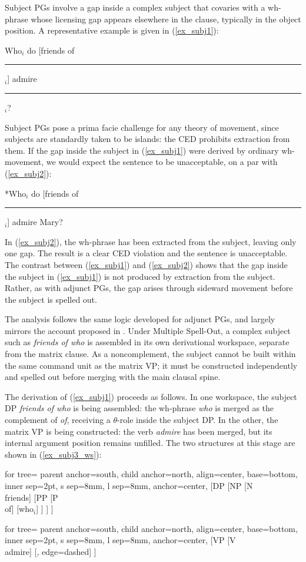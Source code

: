 \documentclass[12pt]{article}
\newcommand{\gap}{\rule{1.25em}{.5pt}} %
\newcommand{\TwoTreeCols}[2]{%
  \noindent\parbox[t]{0.47\linewidth}{#1}%
  \hspace{1.2em}%
  \parbox[t]{0.47\linewidth}{#2}\par
}
\begin{document}
Subject PGs involve a gap inside a complex subject that covaries with a wh-phrase whose licensing gap appears elsewhere in the clause, typically in the object position. A representative example is given in (\ref{ex_subj1}):

\ex \label{ex_subj1}
Who$_i$ do [friends of \gap{}$_i$] admire \gap{}$_i$?
\xe

\noindent
Subject PGs pose a prima facie challenge for any theory of movement, since subjects are standardly taken to be islands: the CED prohibits extraction from them. If the gap inside the subject in (\ref{ex_subj1}) were derived by ordinary wh-movement, we would expect the sentence to be unacceptable, on a par with (\ref{ex_subj2}):

\ex \label{ex_subj2}
*Who$_i$ do [friends of \gap{}$_i$] admire Mary?
\xe

\noindent
In (\ref{ex_subj2}), the wh-phrase has been extracted from the subject, leaving only one gap. The result is a clear CED violation and the sentence is unacceptable. The contrast between (\ref{ex_subj1}) and (\ref{ex_subj2}) shows that the gap inside the subject in (\ref{ex_subj1}) is not produced by extraction from the subject. Rather, as with adjunct PGs, the gap arises through sideward movement before the subject is spelled out.

The analysis follows the same logic developed for adjunct PGs, and largely mirrors the account proposed in \cite{nunes2004}. Under Multiple Spell-Out, a complex subject such as \textit{friends of who} is assembled in its own derivational workspace, separate from the matrix clause. As a noncomplement, the subject cannot be built within the same command unit as the matrix VP; it must be constructed independently and spelled out before merging with the main clausal spine.

The derivation of (\ref{ex_subj1}) proceeds as follows. In one workspace, the subject DP \textit{friends of who} is being assembled: the wh-phrase \textit{who} is merged as the complement of \textit{of}, receiving a $\theta$-role inside the subject DP. In the other, the matrix VP is being constructed: the verb \textit{admire} has been merged, but its internal argument position remains unfilled. The two structures at this stage are shown in (\ref{ex_subj3_ws}):

\ex \label{ex_subj3_ws}
\TwoTreeCols{%
\begin{forest}
for tree={
  parent anchor=south,
  child anchor=north,
  align=center,
  base=bottom,
  inner sep=2pt,
  s sep=8mm,
  l sep=8mm,
  anchor=center,
}
[DP
  [NP
    [N\\friends]
    [PP
      [P\\of]
      [who$_i$]
    ]
  ]
]
\end{forest}%
}{%
\begin{forest}
for tree={
  parent anchor=south,
  child anchor=north,
  align=center,
  base=bottom,
  inner sep=2pt,
  s sep=8mm,
  l sep=8mm,
  anchor=center,
}
[VP
  [V\\admire]
  [\phantom{who$_i$}, edge={dashed}]
]
\end{forest}%
}
\xe
\end{document}
